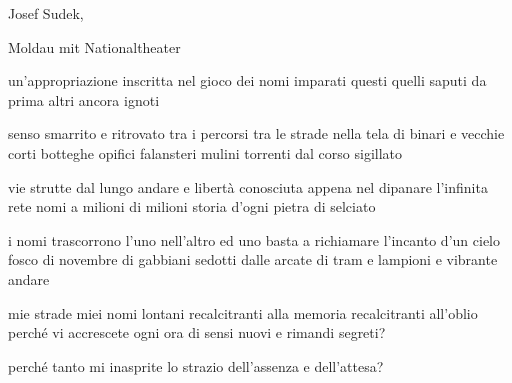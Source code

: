 \clearpage


\begin{artItem}
	Josef Sudek, \begin{otherlanguage}{german}%
		Moldau mit Nationaltheater%
	\end{otherlanguage}
\end{artItem}

\begin{poem}
	\begin{stanza}
		un'appropriazione inscritta\verseline
		nel gioco dei nomi\verseline
		imparati questi\verseline
		quelli saputi da prima\verseline
		altri ancora ignoti
	\end{stanza}

	\begin{stanza}
		senso smarrito e ritrovato\verseline
		tra i percorsi tra le strade\verseline
		nella tela di binari e vecchie corti\verseline
		botteghe opifici falansteri mulini\verseline
		torrenti dal corso sigillato
	\end{stanza}

	\begin{stanza}
		vie strutte dal lungo andare\verseline
		e libertà conosciuta appena\verseline
		nel dipanare l'infinita rete\verseline
		nomi a milioni di milioni\verseline
		storia d'ogni pietra di selciato
	\end{stanza}

	\begin{stanza}
		i nomi trascorrono l'uno nell'altro\verseline
		ed uno basta a richiamare l'incanto\verseline
		d'un cielo fosco di novembre\verseline
		di gabbiani sedotti dalle arcate\verseline
		di tram e lampioni e vibrante andare
	\end{stanza}

	\begin{stanza}
		mie strade miei nomi lontani\verseline
		recalcitranti alla memoria\verseline
		recalcitranti all'oblio\verseline
		perché vi accrescete ogni ora\verseline
		di sensi nuovi e rimandi segreti?
	\end{stanza}

	\begin{stanza}
		perché tanto mi inasprite lo strazio\verseline
		dell'assenza e dell'attesa?
	\end{stanza}
\end{poem}

\clearpage


